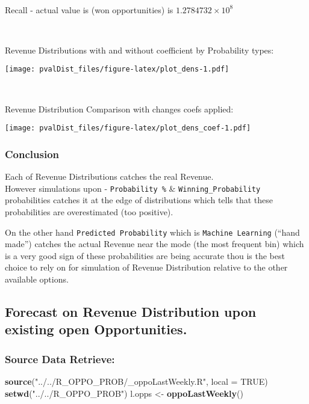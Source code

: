 \documentclass[]{article}
\newenvironment{Shaded}{\begin{snugshade}}{\end{snugshade}}
\newcommand{\DataTypeTok}[1]{\textcolor[rgb]{0.13,0.29,0.53}{#1}}
\newcommand{\KeywordTok}[1]{\textcolor[rgb]{0.13,0.29,0.53}{\textbf{#1}}}
\newcommand{\NormalTok}[1]{#1}
\newcommand{\OtherTok}[1]{\textcolor[rgb]{0.56,0.35,0.01}{#1}}
\newcommand{\StringTok}[1]{\textcolor[rgb]{0.31,0.60,0.02}{#1}}
\begin{document}
~

Recall - actual value is (won opportunities) is
\ensuremath{1.2784732\times 10^{8}}

~

Revenue Distributions with and without coefficient by Probability types:

\texttt{[image: pvalDist\_files/figure-latex/plot\_dens-1.pdf]}

~

Revenue Distribution Comparison with changes coefs applied:

\texttt{[image: pvalDist\_files/figure-latex/plot\_dens\_coef-1.pdf]}

\hypertarget{conclusion}{%
\subsubsection{Conclusion}\label{conclusion}}

Each of Revenue Distributions catches the real Revenue.\\
However simulations upon - \texttt{Probability\ \%} \&
\texttt{Winning\_Probability} probabilities catches it at the edge of
distributions which tells that these probabilities are overestimated
(too positive).

On the other hand \texttt{Predicted\ Probability} which is
\texttt{Machine\ Learning} (``hand made'') catches the actual Revenue
near the mode (the most frequent bin) which is a very good sign of these
probabilities are being accurate thou is the best choice to rely on for
simulation of Revenue Distribution relative to the other available
options.

\hypertarget{forecast-on-revenue-distribution-upon-existing-open-opportunities.}{%
\subsection{Forecast on Revenue Distribution upon existing open
Opportunities.}\label{forecast-on-revenue-distribution-upon-existing-open-opportunities.}}

\hypertarget{source-data-retrieve}{%
\subsubsection{Source Data Retrieve:}\label{source-data-retrieve}}

\begin{Shaded}
\begin{Highlighting}[]
\KeywordTok{source}\NormalTok{(}\StringTok{"../../R_OPPO_PROB/_oppoLastWeekly.R"}\NormalTok{, }\DataTypeTok{local =} \OtherTok{TRUE}\NormalTok{)}
\KeywordTok{setwd}\NormalTok{(}\StringTok{"../../R_OPPO_PROB"}\NormalTok{)}
\NormalTok{l.opps <-}\StringTok{ }\KeywordTok{oppoLastWeekly}\NormalTok{()}
\end{Highlighting}
\end{Shaded}
\end{document}
